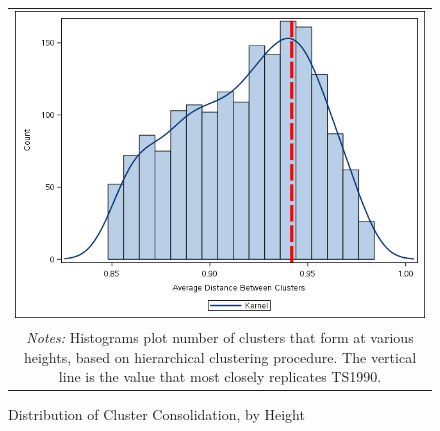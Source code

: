 

\begin{figure}[th]\centering
\caption{Distribution of Cluster Consolidation, by Height }
\begin{tabular}{c}
\includegraphics[width=.48\textwidth]{./figures/distancebetweenclusters.png}\\
\multicolumn{1}{p{4in}}{\footnotesize \emph{Notes:} Histograms plot number of
clusters that form at various heights, based on hierarchical clustering
procedure. The vertical line is the value that most closely replicates TS1990.}
\label{fig:heightdensity}
\end{tabular}
\end{figure}

